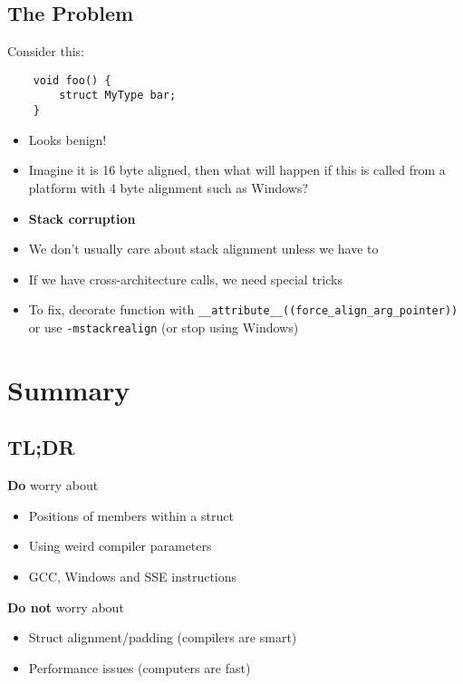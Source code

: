 \documentclass{beamer}
\begin{document}
\subsection{The Problem}
\begin{frame}[fragile]{\insertsection}{\insertsubsection}
    Consider this:
    \begin{verbatim}
    void foo() {
        struct MyType bar;
    }
    \end{verbatim}
    \begin{itemize}
        \item Looks benign!\pause
        \item Imagine it is 16 byte aligned, then what will happen if this is called from a
            platform with 4 byte alignment such as Windows?\pause
        \item \textbf{Stack corruption}
    \end{itemize}
\end{frame}

\begin{frame}[fragile]{\insertsection}{\insertsubsection}
    \begin{itemize}
        \item We don't usually care about stack alignment unless we have to\pause
        \item If we have cross-architecture calls, we need special tricks\pause
        \item To fix, decorate function with \verb|__attribute__((force_align_arg_pointer))| or use
            \verb|-mstackrealign| \pause (or stop using Windows)
    \end{itemize}
\end{frame}

\section{Summary}
\subsection{TL;DR}
\begin{frame}{\insertsection}{\insertsubsection}
    \begin{block}{\textbf{Do} worry about}
        \begin{itemize}
            \item Positions of members within a struct
            \item Using weird compiler parameters
            \item GCC, Windows and SSE instructions
        \end{itemize}
    \end{block}
    \pause
    \begin{block}{\textbf{Do not} worry about}
        \begin{itemize}
            \item Struct alignment/padding (compilers are smart)
            \item Performance issues (computers are fast)
        \end{itemize}
    \end{block}
\end{frame}
\end{document}
